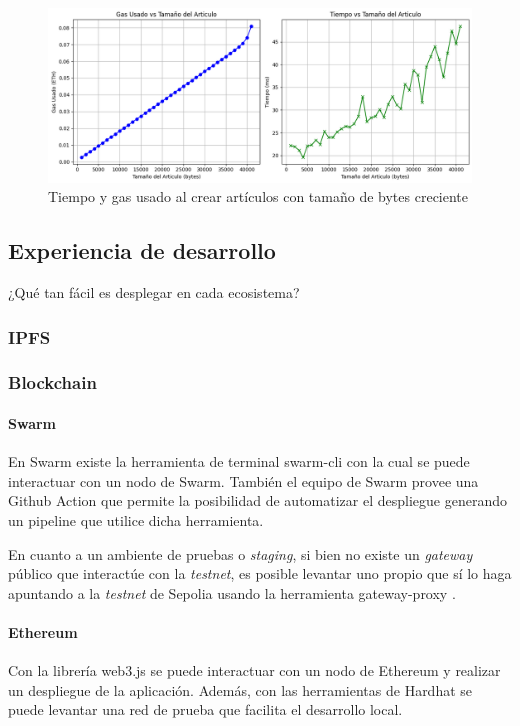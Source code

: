 \begin{figure}[H]
    \centering
    \includegraphics[width=1\linewidth]{img/aw-eth-bytes-articulo-incremental.png}
    \caption{Tiempo y gas usado al crear artículos con tamaño de bytes creciente}
    \label{fig:aw-eth-bytes-articulo-incremental.png}
\end{figure}

\subsection{Experiencia de desarrollo} %

¿Qué tan fácil es desplegar en cada ecosistema?

\subsubsection{IPFS}

\subsubsection{Blockchain}

\paragraph{Swarm}
En Swarm existe la herramienta de terminal swarm-cli \cite{swarm-cli} con la cual se puede interactuar con un nodo de Swarm. También el equipo de Swarm provee una Github Action que permite la posibilidad de automatizar el despliegue generando un pipeline que utilice dicha herramienta.

En cuanto a un ambiente de pruebas o \textit{staging}, si bien no existe un \textit{gateway} público que interactúe con la \textit{testnet}, es posible levantar uno propio que sí lo haga apuntando a la \textit{testnet} de Sepolia usando la herramienta gateway-proxy \cite{gateway-proxy}.

\paragraph{Ethereum}
Con la librería web3.js se puede interactuar con un nodo de Ethereum y realizar un despliegue de la aplicación. Además, con las herramientas de Hardhat se puede levantar una red de prueba que facilita el desarrollo local.

